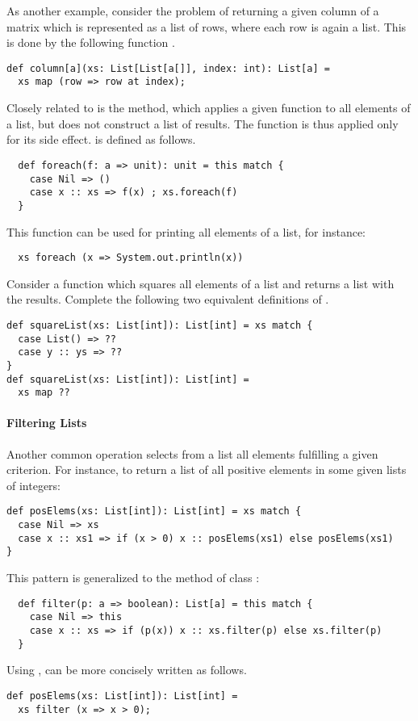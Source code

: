 As another example, consider the problem of returning a given column
of a matrix which is represented as a list of rows, where each row is
again a list. This is done by the following function .

\begin{lstlisting}
def column[a](xs: List[List[a[]], index: int): List[a] = 
  xs map (row => row at index);
\end{lstlisting}

Closely related to  is the  method, which
applies a given function to all elements of a list, but does not
construct a list of results. The function is thus applied only for its
side effect.  is defined as follows.
\begin{lstlisting}
  def foreach(f: a => unit): unit = this match {
    case Nil => ()
    case x :: xs => f(x) ; xs.foreach(f)
  }
\end{lstlisting}
This function can be used for printing all elements of a list, for instance:
\begin{lstlisting}
  xs foreach (x => System.out.println(x))
\end{lstlisting} 

\begin{exercise} Consider a function which squares all elements of a list and
returns a list with the results. Complete the following two equivalent
definitions of .

\begin{lstlisting}
def squareList(xs: List[int]): List[int] = xs match {
  case List() => ??
  case y :: ys => ??
}
def squareList(xs: List[int]): List[int] = 
  xs map ??
\end{lstlisting}
\end{exercise}

\paragraph{Filtering Lists}
Another common operation selects from a list all elements fulfilling a
given criterion. For instance, to return a list of all positive
elements in some given lists of integers:
\begin{lstlisting}
def posElems(xs: List[int]): List[int] = xs match {
  case Nil => xs
  case x :: xs1 => if (x > 0) x :: posElems(xs1) else posElems(xs1)
}
\end{lstlisting}
This pattern is generalized to the  method of class :
\begin{lstlisting}
  def filter(p: a => boolean): List[a] = this match {
    case Nil => this
    case x :: xs => if (p(x)) x :: xs.filter(p) else xs.filter(p)
  }
\end{lstlisting}
Using ,  can be more concisely written as
follows.
\begin{lstlisting}
def posElems(xs: List[int]): List[int] = 
  xs filter (x => x > 0);
\end{lstlisting}

